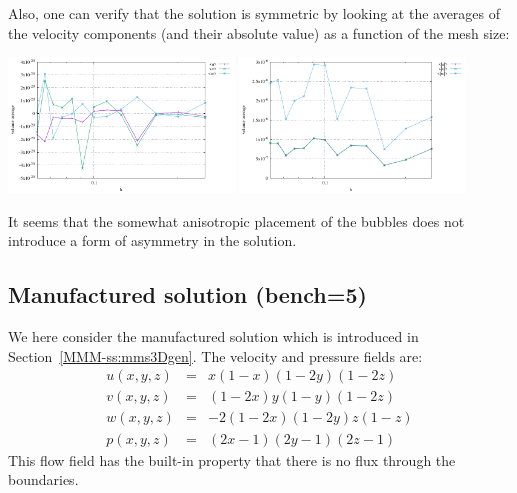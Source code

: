 Also, one can verify that the solution is symmetric by looking at the averages of the 
velocity components (and their absolute value) as a function of the mesh size:
\begin{center}
\includegraphics[width=6cm]{python_codes/fieldstone_82/results/bench4/averages.pdf}
\includegraphics[width=6cm]{python_codes/fieldstone_82/results/bench4/averages_abs.pdf}
\end{center}
It seems that the somewhat anisotropic placement of the bubbles does not introduce 
a form of asymmetry in the solution.

\subsection*{Manufactured solution (bench=5)}

We here consider the manufactured solution which is introduced in Section~\ref{MMM-ss:mms3Dgen}.
The velocity and pressure fields are:
\begin{eqnarray}
u(x,y,z) &=& x(1-x)(1-2y)(1-2z)\\
v(x,y,z) &=& (1-2x) y(1-y) (1-2z) \\
w(x,y,z) &=& -2(1-2x)(1-2y)z(1-z) \\
p(x,y,z) &=& (2x-1)(2y-1)(2z-1)
\end{eqnarray}
This flow field has the built-in property that there is no flux through the 
boundaries.

